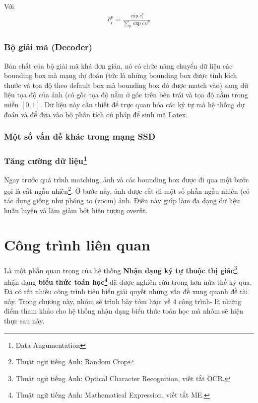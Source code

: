 \documentclass[a4paper,12pt]{article}
\begin{document}
	Với \begin{align}\hat{c}_i^p = \frac{\exp{c_i^p}}{\sum_p \exp{c)i^p}}\end{align}
	
	\subsubsection{Bộ giải mã (Decoder)}
	
	Bản chất của bộ giải mã khá đơn giản, nó có chức năng chuyển dữ liệu các bounding box mà mạng dự đoán (tức là những bounding box được tính kích thước và tọa độ theo default box mà bounding box đó được match vào) sang dữ liệu tọa độ của ảnh (có gốc tọa độ nằm ở góc trên bên trái và tọa độ nằm trong miền $[0, 1]$. Dữ liệu này cần thiết để trực quan hóa các ký tự mà hệ thống dự đoán và để đưa vào bộ phân tích cú pháp để sinh mã Latex.
	
	\subsubsection{Một số vấn đề khác trong mạng SSD\cite{liu2016ssd}}
	\subsubsection*{Tăng cường dữ liệu\footnote{Data Augumentation}}
	
	Ngay trước quá trình matching, ảnh và các bounding box được đi qua một bước gọi là cắt ngẫu nhiên\footnote{Thuật ngữ tiếng Anh: Random Crop}. Ở bước này, ảnh được cắt đi một số phần ngẫu nhiên (có tác dụng giống như phóng to (zoom) ảnh. Điều này giúp làm đa dạng dữ liệu huấn luyện và làm giảm bớt hiện tượng overfit.
	
	
	
	
	
	\newpage
	\section{Công trình liên quan}
	Là một phần quan trọng của hệ thống \textbf{Nhận dạng ký tự thuộc thị giác}\footnote{Thuật ngữ tiếng Anh: Optical Character Recognition, viết tắt OCR.}, nhận dạng \textbf{biểu thức toán học}\footnote{Thuật ngữ tiếng Anh: Mathematical Expression, viết tắt ME.} đã được nghiên cứu trong hơn nửa thế kỷ qua. Đã có rất nhiều công trình tiêu biểu giải quyết những vấn đề xung quanh đề tài này. Trong chương này, nhóm sẽ trình bày tóm lược về 4 công trình- là những điểm tham khảo cho hệ thống nhận dạng biểu thức toán học mà nhóm sẽ hiện thực sau này.\\
\end{document}
